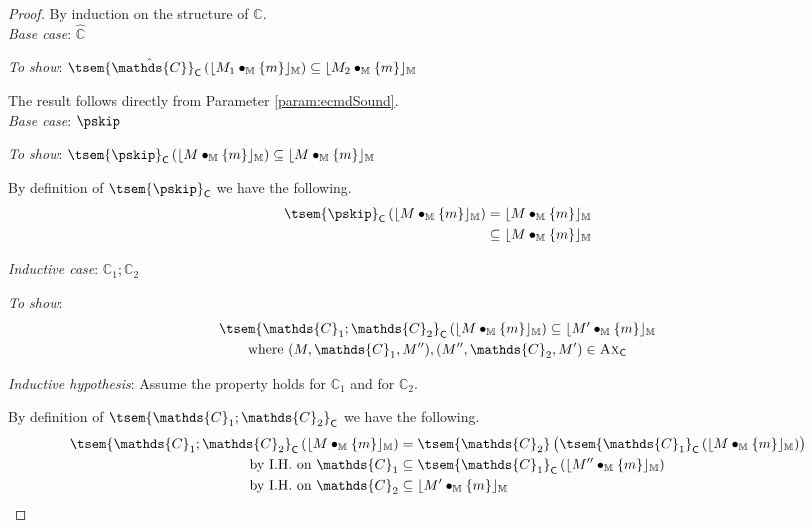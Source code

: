 {\parindent0pt
\begin{proof}
By induction on the structure of $\mathds{C}$. \\

\textit{Base case}: $\mathds{\hat{C}}$

\textit{To show}: $\tsem{\hat{\mathds{C}}}_\mathsf{C} \left( \lfloor M_1 \bullet_\mathbb{M} \{m\} \rfloor_\mathbb{M} \right) \subseteq \lfloor M_2 \bullet_\mathbb{M} \{m\} \rfloor_\mathbb{M}$

The result follows directly from Parameter \ref{param:ecmdSound}. \\

\textit{Base case}: $\pskip$

\textit{To show}: $\tsem{\pskip}_\mathsf{C} \left( \lfloor M \bullet_\mathbb{M} \{m\} \rfloor_\mathbb{M}\right) \subseteq \lfloor M \bullet_\mathbb{M} \{m\} \rfloor_\mathbb{M}$

By definition of $\tsem{\pskip}_\mathsf{C}$ we have the following.
\begin{align*}
	\tsem{\pskip}_\mathsf{C} \left( \lfloor M \bullet_\mathbb{M} \{m\} \rfloor_\mathbb{M} \right)
	&=
	\lfloor M \bullet_\mathbb{M} \{m\} \rfloor_\mathbb{M}
	\\
	&\subseteq \lfloor M \bullet_\mathbb{M} \{m\} \rfloor_\mathbb{M}
\end{align*} 

\textit{Inductive case}: $\mathds{C}_1 ; \mathds{C}_2$

\textit{To show}:
\begin{gather*}
	\tsem{\mathds{C}_1 ; \mathds{C}_2}_\mathsf{C} \left( \lfloor M \bullet_\mathbb{M} \{m\} \rfloor_\mathbb{M} \right) \subseteq \lfloor M' \bullet_\mathbb{M} \{m\} \rfloor_\mathbb{M}
	\\
	\text{where } (M, \mathds{C}_1, M''), (M'', \mathds{C}_2, M') \in \textsc{Ax}_\mathsf{C}
\end{gather*}

\textit{Inductive hypothesis}: Assume the property holds for $\mathds{C}_1$ and for $\mathds{C}_2$.

By definition of $\tsem{\mathds{C}_1 ; \mathds{C}_2}_\mathsf{C}$ we have the following.
\begin{align*}
	\tsem{\mathds{C}_1 ; \mathds{C}_2}_\mathsf{C} \left( \lfloor M \bullet_\mathbb{M} \{m\} \rfloor_\mathbb{M} \right)
	&=
	\tsem{\mathds{C}_2}\left( \tsem{\mathds{C}_1}_\mathsf{C} \left( \lfloor M \bullet_\mathbb{M} \{m\}\rfloor_\mathbb{M}\right) \right) \\
	\text{by I.H. on } \mathds{C}_1 &\subseteq
	\tsem{\mathds{C}_1}_\mathsf{C} \left( \lfloor M'' \bullet_\mathbb{M} \{m\} \rfloor_\mathbb{M} \right) \\
	\text{by I.H. on } \mathds{C}_2 &\subseteq
	\lfloor M' \bullet_\mathbb{M} \{m\} \rfloor_\mathbb{M}
\end{align*}


\end{proof}}

